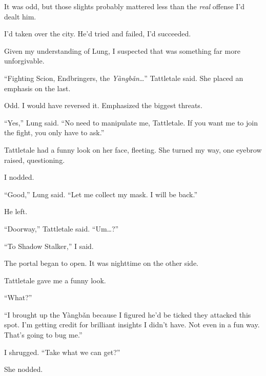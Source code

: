 It was odd, but those slights probably mattered less than the \emph{real} offense I'd dealt him.



I'd taken over the city.  He'd tried and failed, I'd succeeded.



Given my understanding of Lung, I suspected that was something far more unforgivable.



``Fighting Scion, Endbringers, the \emph{Y\`{a}ngb\v{a}n}\ldots''  Tattletale said.  She placed an emphasis on the last.



Odd.  I would have reversed it.  Emphasized the biggest threats.



``Yes,'' Lung said.  ``No need to manipulate me, Tattletale.  If you want me to join the fight, you only have to ask.''



Tattletale had a funny look on her face, fleeting.  She turned my way, one eyebrow raised, questioning.



I nodded.



``Good,'' Lung said.  ``Let me collect my mask.  I will be back.''



He left.



``Doorway,'' Tattletale said.  ``Um\ldots?''



``To Shadow Stalker,'' I said.



The portal began to open.  It was nighttime on the other side.



Tattletale gave me a funny look.



``What?''



``I brought up the Y\`{a}ngb\v{a}n because I figured he'd be ticked they attacked this spot.  I'm getting credit for brilliant insights I didn't have.  Not even in a fun way.  That's going to bug me.''



I shrugged.  ``Take what we can get?''



She nodded.



